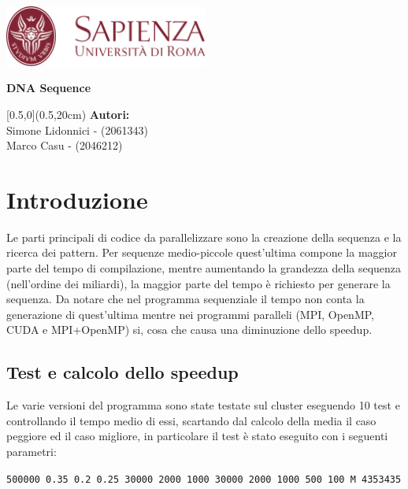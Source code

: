\documentclass[12pt,openany]{report}
\date{\today}
\makeatletter
\def\tit{DNA Sequence}
\let\datename\@date
\def\authorname{Simone Lidonnici - (2061343)\\Marco Casu - (2046212)}
\makeatother
\begin{document}
\begin{titlepage}
    \begin{center}
        \includegraphics[width=0.5\textwidth]{images/Sapienza_logo.png}
    \end{center}
    \centering\Large \textbf{\color{Sapienza}{Facoltà di Ingegneria dell'Informazione, Informatica e Statistica\\Dipartimento di Informatica}}
    \vspace{4cm}
    \begin{tcolorbox}[enhanced, width=\textwidth, colframe=Sapienza, colback=white, halign=flush center, sharp corners=all, boxrule=1mm, bottom=5mm, top=5mm]
        \Huge\textbf{\tit}
    \end{tcolorbox}
    \begin{textblock*}{\textwidth}[0.5,0](0.5\pdfpagewidth,20cm)
        \centering\large\textbf{Autori:}\\\authorname
    \end{textblock*}
    \vfill
    \centering\large\datename
\end{titlepage}

\section{Introduzione}
Le parti principali di codice da parallelizzare sono la creazione della sequenza e la ricerca dei pattern. Per sequenze medio-piccole quest'ultima compone la maggior parte del tempo di compilazione, mentre aumentando la grandezza della sequenza (nell'ordine dei miliardi), la maggior parte del tempo è richiesto per generare la sequenza. Da notare che nel programma sequenziale il tempo non conta la generazione di quest'ultima mentre nei programmi paralleli (MPI, OpenMP, CUDA e MPI+OpenMP) si, cosa che causa una diminuzione dello speedup.
\subsection{Test e calcolo dello speedup}
Le varie versioni del programma sono state testate sul cluster eseguendo 10 test e controllando il tempo medio di essi, scartando dal calcolo della media il caso peggiore ed il caso migliore, in particolare il test è stato eseguito con i seguenti parametri:
\begin{center}
    \texttt{500000 0.35 0.2 0.25 30000 2000 1000 30000 2000 1000 500 100 M 4353435}
\end{center}
\end{document}
